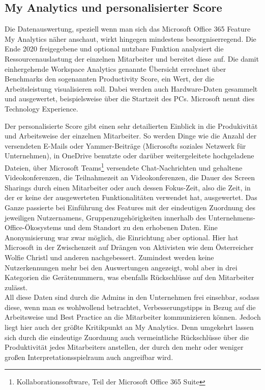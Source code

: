 \subsection{My Analytics und personalisierter Score}
Die Datenauswertung, speziell wenn man sich das Microsoft Office 365 Feature \glqq My Analytics\grqq{} näher anschaut, wirkt hingegen mindestens besorgniserregend. Die Ende 2020 freigegebene und optional nutzbare Funktion analysiert die Ressourcenauslastung der einzelnen Mitarbeiter und bereitet diese auf. Die damit einhergehende \glqq Workspace Analytics\grqq{} genannte Übersicht errechnet über Benchmarks den sogenannten \glqq Productivity Score\grqq{}, ein Wert, der die Arbeitsleistung visualisieren soll. Dabei werden auch Hardware-Daten gesammelt und ausgewertet, beispielsweise über die Startzeit des PCs. Microsoft nennt dies \glqq Technology Experience\grqq{}.

Der personalisierte Score gibt einen sehr detailierten Einblick in die Produkivität und Arbeitsweise der einzelnen Mitarbeiter. So werden Dinge wie die Anzahl der versendeten E-Mails oder Yammer-Beiträge (Microsofts soziales Netzwerk für Unternehmen), in OneDrive benutzte oder darüber weitergeleitete hochgeladene Dateien, über Microsoft Teams\footnote{Kollaborationssoftware, Teil der Microsoft Office 365 Suite} versendete Chat-Nachrichten und gehaltene Videokonferenzen, die Teilnahmezeit an Videokonferenzen, die Dauer des Screen Sharings durch einen Mitarbeiter oder auch dessen \glqq Fokus-Zeit\grqq{}, also die Zeit, in der er keine der ausgewerteten Funktionalitäten verwendet hat, ausgewertet. Das Ganze passierte bei Einführung des Features mit der eindeutigen Zuordnung des jeweiligen Nutzernamens, Gruppenzugehörigkeiten innerhalb des Unternehmens-Office-Ökosystems und dem Standort zu den erhobenen Daten. Eine Anonymisierung war zwar möglich, die Einrichtung aber optional. Hier hat Microsoft in der Zwischenzeit auf Drängen von Aktivisten wie dem Österreicher Wolfie Christl und anderen nachgebessert. Zumindest werden keine Nutzerkennungen mehr bei den Auswertungen angezeigt, wohl aber in drei Kategorien die Gerätenummern, was ebenfalls Rückschlüsse auf den Mitarbeiter zulässt.\\

All diese Daten sind durch die Admins in den Unternehmen frei einsehbar, sodass diese, wenn man es wohlwollend betrachtet, Verbesserungstipps in Bezug auf die Arbeitsweise und Best Practice an die Mitarbeiter kommunizieren können. Jedoch liegt hier auch der größte Kritikpunkt an My Analytics. Denn umgekehrt lassen sich durch die eindeutige Zuordnung auch vermeintliche Rückschlüsse über die Produktivität jedes Mitarbeiters anstellen, der durch den mehr oder weniger großen Interpretationsspielraum auch angreifbar wird.

